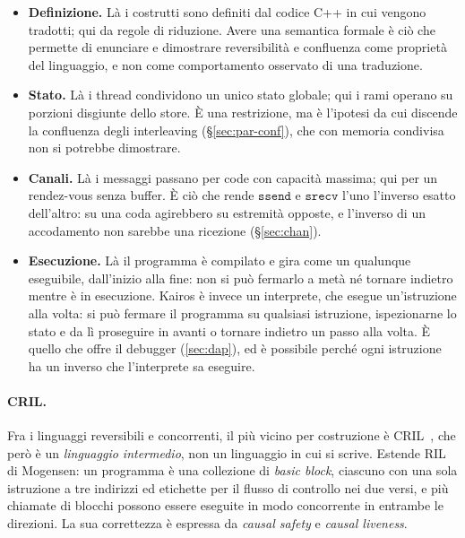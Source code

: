 \begin{itemize}
  \item \textbf{Definizione.} Là i costrutti sono definiti dal codice C++ in cui
    vengono tradotti; qui da regole di riduzione. Avere una semantica formale è
    ciò che permette di enunciare e dimostrare reversibilità e confluenza come
    proprietà del linguaggio, e non come comportamento osservato di una
    traduzione.
  \item \textbf{Stato.} Là i thread condividono un unico stato globale; qui i
    rami operano su porzioni disgiunte dello store. È una restrizione, ma è
    l'ipotesi da cui discende la confluenza degli interleaving
    (\S\ref{sec:par-conf}), che con memoria condivisa non si potrebbe dimostrare.
  \item \textbf{Canali.} Là i messaggi passano per code con capacità massima;
    qui per un rendez-vous senza buffer. È ciò che rende $\mathtt{ssend}$ e
    $\mathtt{srecv}$ l'uno l'inverso esatto dell'altro: su una coda agirebbero
    su estremità opposte, e l'inverso di un accodamento non sarebbe una
    ricezione (\S\ref{sec:chan}).
  \item \textbf{Esecuzione.} Là il programma è compilato e gira come un
    qualunque eseguibile, dall'inizio alla fine: non si può fermarlo a metà né
    tornare indietro mentre è in esecuzione. Kairos è invece un interprete, che
    esegue un'istruzione alla volta: si può fermare il programma su qualsiasi
    istruzione, ispezionarne lo stato e da lì proseguire in avanti o tornare
    indietro un passo alla volta. È quello che offre il debugger
    (\cref{sec:dap}), ed è possibile perché ogni istruzione ha un inverso che
    l'interprete sa eseguire.
\end{itemize}

\paragraph{CRIL.} Fra i linguaggi reversibili e concorrenti, il più vicino per
costruzione è CRIL~\cite{OguchiYuen2024}, che però è un \emph{linguaggio
intermedio}, non un linguaggio in cui si scrive. Estende RIL di Mogensen: un
programma è una collezione di \emph{basic block}, ciascuno con una sola
istruzione a tre indirizzi ed etichette per il flusso di controllo nei due
versi, e più chiamate di blocchi possono essere eseguite in modo concorrente in
entrambe le direzioni. La sua correttezza è espressa da \emph{causal safety} e
\emph{causal liveness}.

